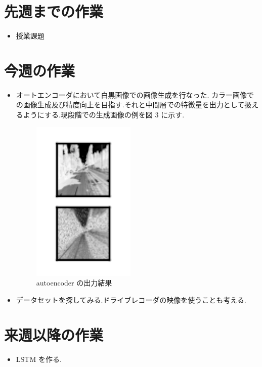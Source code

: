 \section{先週までの作業}
\begin{itemize}
          \item 授業課題
\end{itemize}

\section{今週の作業}
\begin{itemize}       
         \item オートエンコーダにおいて白黒画像での画像生成を行なった. カラー画像での画像生成及び精度向上を目指す.それと中間層での特徴量を出力として扱えるようにする.現段階での生成画像の例を図 3 に示す.
\begin{figure}[hb]
\begin{center}
\includegraphics[scale=1.0]{autoencoder_1.png}
\caption{autoencoder の出力結果}
\end{center}
\end{figure}
         \item データセットを探してみる.ドライブレコーダの映像を使うことも考える.
\end{itemize}

\section{来週以降の作業}
\begin{itemize}
         \item LSTM を作る.
\end{itemize}





